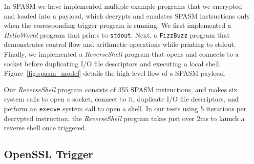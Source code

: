 In SPASM we have implemented multiple example programs that we encrypted and
loaded into a \speculake payload, which decrypts and emulates SPASM instructions
only when the corresponding trigger program is running.
We first implemented a \textit{HelloWorld}
program that prints to \texttt{stdout}. Next, a \texttt{FizzBuzz} program that
demonstrates control flow and arithmetic operations while printing to stdout.
Finally, we implemented a \textit{ReverseShell} program that opens and connects to a socket
before duplicating I/O file descriptors and executing a local shell.
Figure~\ref{fig:spasm_model} details the high-level flow of a SPASM payload.



Our \textit{ReverseShell} program consists of 355 SPASM instructions, and
makes six system calls to open a socket,
connect to it, duplicate I/O file descriptors, and perform an \texttt{execve}
system call to open a shell.
In our tests using 5 iterations per decrypted instruction, the
\textit{ReverseShell} program takes just over 2ms to launch a reverse shell
once triggered.


\FigSpasmModel

\subsection{OpenSSL Trigger}
\label{subsec:openssl-impl}


